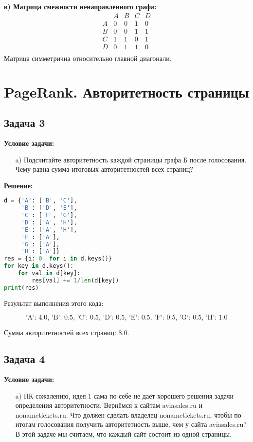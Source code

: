 \documentclass[a4paper,12pt]{article}
\begin{document}
\textbf{в) Матрица смежности ненаправленного графа:}
\[
\begin{array}{c|cccc}
      & A & B & C & D \\ \hline
    A & 0 & 0 & 1 & 0 \\
    B & 0 & 0 & 1 & 1 \\
    C & 1 & 1 & 0 & 1 \\
    D & 0 & 1 & 1 & 0 \\
\end{array} 
\]
Матрица симметрична относительно главной диагонали.

\vspace{1cm}


\section{PageRank. Авторитетность страницы}

\subsection{Задача 3}
\textbf{Условие задачи:}
\begin{itemize}
    \item[a)] Подсчитайте авторитетность каждой страницы графа Б после голосования. Чему равна сумма итоговых авторитетностей всех страниц?
\end{itemize}

\textbf{Решение:}

\begin{lstlisting}[language=Python]
d = {'A': ['B', 'C'],
     'B': ['D', 'E'],
     'C': ['F', 'G'],
     'D': ['A', 'H'],
     'E': ['A', 'H'],
     'F': ['A'],
     'G': ['A'],
     'H': ['A']}
res = {i: 0. for i in d.keys()}
for key in d.keys():
    for val in d[key]:
        res[val] += 1/len(d[key])
print(res)
\end{lstlisting}

Результат выполнения этого кода:

\[
\text{{'A': 4.0, 'B': 0.5, 'C': 0.5, 'D': 0.5, 'E': 0.5, 'F': 0.5, 'G': 0.5, 'H': 1.0}}
\]

Сумма авторитетностей всех страниц: 8.0.

\vspace{1cm}

\subsection{Задача 4}
\textbf{Условие задачи:}
\begin{itemize}
    \item[a)] ПК сожалению, идея 1 сама по себе не даёт хорошего решения задачи определения авторитетности. Вернёмся к сайтам aviasales.ru и nonametickets.ru. Что должен сделать владелец
nonametickets.ru, чтобы по итогам голосования получить авторитетность выше, чем у сайта
aviasales.ru?
В этой задаче мы считаем, что каждый сайт состоит из одной страницы.
\end{itemize}
\end{document}
